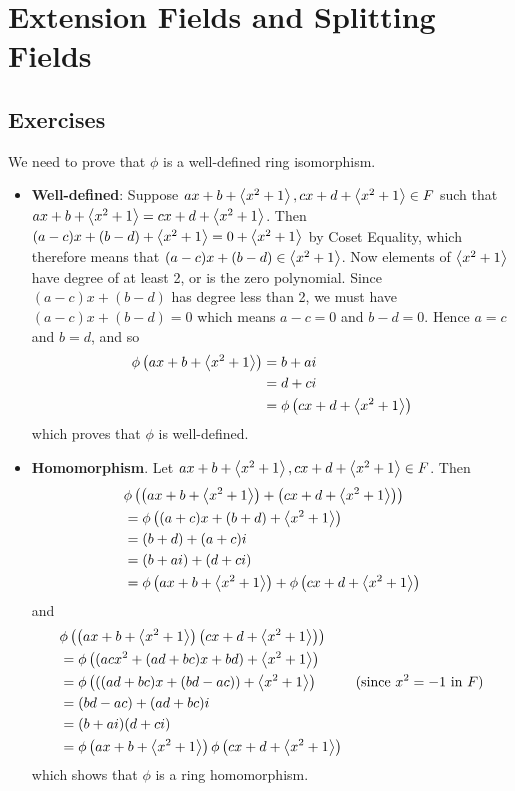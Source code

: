 \section{Extension Fields and Splitting Fields}
\subsection*{Exercises}
\begin{questions}
    \item We need to prove that $\phi$ is a well-defined ring isomorphism.
    \begin{itemize}
        \item \textbf{Well-defined}: Suppose $ax + b + \left\langle x^2+1\right\rangle, cx + d + \left\langle x^2+1\right\rangle \in F$ such that $ax + b + \left\langle x^2+1\right\rangle = cx + d + \left\langle x^2+1\right\rangle$. Then $(a - c)x + (b - d) + \left\langle x^2 + 1\right\rangle = 0 + \left\langle x^2+1\right\rangle$ by Coset Equality, which therefore means that $(a-c)x + (b-d) \in \left\langle x^2+1\right\rangle$. Now elements of $\left\langle x^2+1\right\rangle$ have degree of at least 2, or is the zero polynomial. Since $(a-c)x + (b-d)$ has degree less than 2, we must have $(a-c)x + (b-d) = 0$ which means $a - c = 0$ and $b - d = 0$. Hence $a = c$ and $b = d$, and so
        \begin{align*}
            \phi\left(ax + b + \left\langle x^2+1\right\rangle\right) &= b + ai\\
            &= d + ci\\
            &= \phi\left(cx + d + \left\langle x^2+1\right\rangle\right)
        \end{align*}
        which proves that $\phi$ is well-defined.

        \item \textbf{Homomorphism}. Let $ax + b + \left\langle x^2+1\right\rangle, cx + d + \left\langle x^2+1\right\rangle \in F$. Then
        \begin{align*}
            &\phi\left(\left(ax + b + \left\langle x^2+1\right\rangle\right) + \left(cx + d + \left\langle x^2+1\right\rangle\right)\right)\\
            &= \phi\left((a+c)x + (b+d) + \left\langle x^2+1\right\rangle\right)\\
            &= (b+d) + (a+c)i\\
            &= (b+ai) + (d+ci)\\
            &= \phi\left(ax + b + \left\langle x^2+1\right\rangle\right) + \phi\left(cx + d + \left\langle x^2+1\right\rangle\right)
        \end{align*}
        and
        \begin{align*}
            &\phi\left(\left(ax + b + \left\langle x^2+1\right\rangle\right)\left(cx + d + \left\langle x^2+1\right\rangle\right)\right)\\
            &= \phi\left((acx^2 + (ad + bc)x + bd) + \left\langle x^2+1\right\rangle\right)\\
            &= \phi\left(((ad + bc)x + (bd - ac)) + \left\langle x^2+1\right\rangle\right) & (\text{since } x^2 = -1 \text{ in } F)\\
            &= (bd - ac) + (ad + bc)i\\
            &= (b + ai)(d + ci)\\
            &= \phi\left(ax + b + \left\langle x^2+1\right\rangle\right)\phi\left(cx + d + \left\langle x^2+1\right\rangle\right)
        \end{align*}
        which shows that $\phi$ is a ring homomorphism.


\end{itemize}
\end{questions}
